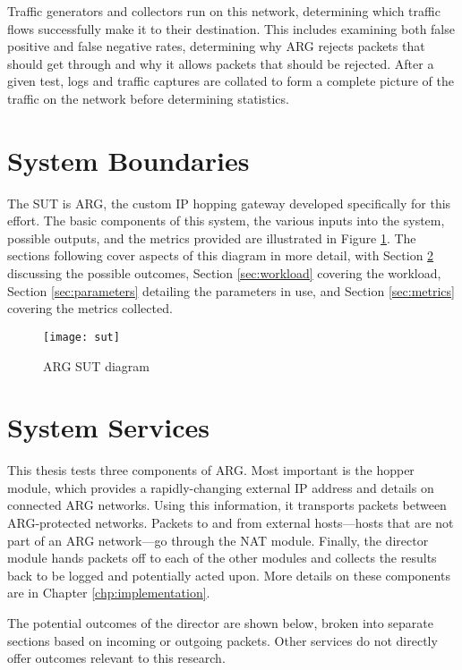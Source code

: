 \par Traffic generators and collectors run on this network, determining which traffic flows successfully make it to their destination. This includes examining both false positive and false negative rates, determining why \ac{ARG} rejects packets that should get through and why it allows packets that should be rejected. After a given test, logs and traffic captures are collated to form a complete picture of the traffic on the network before determining statistics.

\FloatBarrier
\section{System Boundaries}
\label{sec:boundaries}
\par The \ac{SUT} is \ac{ARG}, the custom \ac{IP} hopping gateway developed specifically for this effort. The basic components of this system, the various inputs into the system, possible outputs, and the metrics provided are illustrated in Figure \ref{fig:sut}. The sections following cover aspects of this diagram in more detail, with Section \ref{sec:services} discussing the possible outcomes, Section \ref{sec:workload} covering the workload, Section \ref{sec:parameters} detailing the parameters in use, and Section \ref{sec:metrics} covering the metrics collected.

\begin{figure}
	\caption{\ac{ARG} \ac{SUT} diagram}
	\label{fig:sut}
	\centering
	\texttt{[image: sut]}
\end{figure}

\FloatBarrier
\section{System Services}
\label{sec:services}
\par This thesis tests three components of \ac{ARG}. Most important is the hopper module, which provides a rapidly-changing external \ac{IP} address and details on connected ARG networks. Using this information, it transports packets between ARG-protected networks. Packets to and from external hosts---hosts that are not part of an ARG network---go through the \ac{NAT} module. Finally, the director module hands packets off to each of the other modules and collects the results back to be logged and potentially acted upon. More details on these components are in Chapter \ref{chp:implementation}.

\par The potential outcomes of the director are shown below, broken into separate sections based on incoming or outgoing packets. Other services do not directly offer outcomes relevant to this research.

